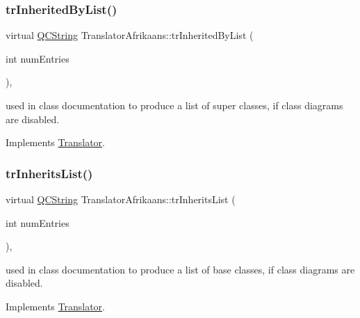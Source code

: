 \mbox{\label{class_translator_afrikaans_a2e343840689976e15cf20029acf219b9}} 
\subsubsection{\texorpdfstring{trInheritedByList()}{trInheritedByList()}}
{\footnotesize\ttfamily virtual \mbox{\hyperlink{class_q_c_string}{Q\+C\+String}} Translator\+Afrikaans\+::tr\+Inherited\+By\+List (\begin{DoxyParamCaption}\item[{int}]{num\+Entries }\end{DoxyParamCaption})\hspace{0.3cm}{\ttfamily [inline]}, {\ttfamily [virtual]}}

used in class documentation to produce a list of super classes, if class diagrams are disabled. 

Implements \mbox{\hyperlink{class_translator}{Translator}}.

\mbox{\label{class_translator_afrikaans_a6cf5cc7655088095b853a0ff31c768ed}} 
\subsubsection{\texorpdfstring{trInheritsList()}{trInheritsList()}}
{\footnotesize\ttfamily virtual \mbox{\hyperlink{class_q_c_string}{Q\+C\+String}} Translator\+Afrikaans\+::tr\+Inherits\+List (\begin{DoxyParamCaption}\item[{int}]{num\+Entries }\end{DoxyParamCaption})\hspace{0.3cm}{\ttfamily [inline]}, {\ttfamily [virtual]}}

used in class documentation to produce a list of base classes, if class diagrams are disabled. 

Implements \mbox{\hyperlink{class_translator}{Translator}}.

\mbox{\label{class_translator_afrikaans_a34d3b133c8a79ae41f877bee18b172ee}} 
